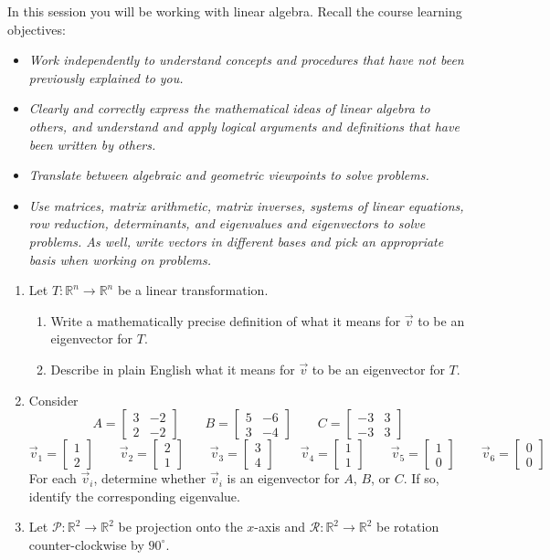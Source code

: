 \documentclass[red]{tutorial}
\newcommand{\R}{\mathbb{R}}
\newcommand{\mat}[1]{\begin{bmatrix}#1\end{bmatrix}}
\theoremstyle{definition}
\theoremstyle{theorem}
\begin{document}
	\begin{tutorial}

		\begin{objectives} %
      In this session you will be working with linear algebra. Recall the course learning objectives:
      \begin{itemize}
        \item
          \emph{Work independently to understand concepts and procedures that have not
          been previously explained to you.}
        \item
          \emph{Clearly and correctly express the mathematical ideas of linear
          algebra to others, and understand and apply logical arguments and
          definitions that have been written by others.}
        \item
          \emph{Translate between algebraic and geometric viewpoints to solve
          problems.}
        \item
          \emph{Use matrices, matrix arithmetic, matrix inverses, systems of linear
          equations, row reduction, determinants, and eigenvalues and eigenvectors
          to solve problems. As well, write vectors in different bases and pick an
          appropriate basis when working on problems.}
      \end{itemize}
		\end{objectives}

\begin{enumerate}
	\item Let $T:\R^n\to\R^n$ be a linear transformation.
	\begin{enumerate}
		\item Write a mathematically precise definition of what it means for $\vec v$ to be an eigenvector
			for $T$.
		\item Describe in plain English what it means for $\vec v$ to be an eigenvector for $T$.
	\end{enumerate}
	\item Consider
		\[
			A=\mat{3&-2\\2&-2}\qquad
			B=\mat{5&-6\\3&-4}\qquad
			C=\mat{-3&3\\-3&3}
		\]
		\[
			\vec v_1=\mat{1\\2}\qquad
			\vec v_2=\mat{2\\1}\qquad
			\vec v_3=\mat{3\\4}\qquad
			\vec v_4=\mat{1\\1}\qquad
			\vec v_5=\mat{1\\0}\qquad
			\vec v_6=\mat{0\\0}
		\]
		For each $\vec v_i$, determine whether $\vec v_i$ is an eigenvector for $A$, $B$, or $C$. If so,
		identify the corresponding eigenvalue.
	\item Let $\mathcal P:\R^2\to\R^2$ be projection onto the $x$-axis and $\mathcal R:\R^2\to\R^2$ be rotation
		counter-clockwise by $90^\circ$.


\end{enumerate}
\end{tutorial}
\end{document}
